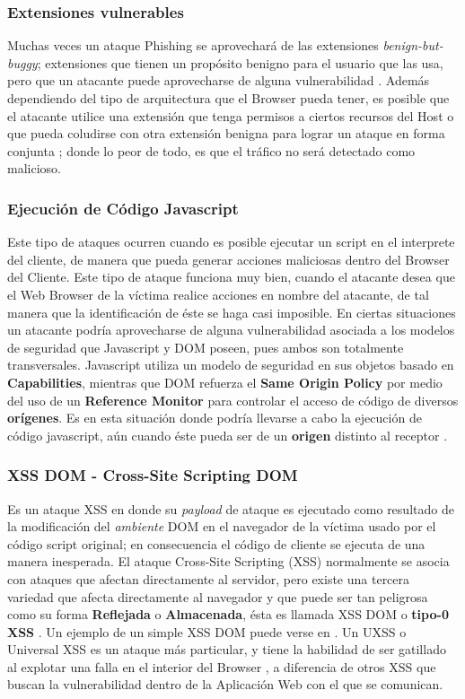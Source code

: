 	\subsubsection{Extensiones vulnerables}
	Muchas veces un ataque Phishing se aprovechará de las extensiones \textit{benign-but-buggy}; extensiones que tienen un propósito benigno para el usuario que las usa, pero que un atacante puede aprovecharse de alguna vulnerabilidad \cite{Barth2010, Liu2012}. Además dependiendo del tipo de arquitectura que el Browser pueda tener, es posible que el atacante utilice una extensión que tenga permisos a ciertos recursos del Host o que pueda coludirse con otra extensión benigna para lograr un ataque en forma conjunta \cite{Saini2014}; donde lo peor de todo, es que el tráfico no será detectado como malicioso.

	\subsubsection{Ejecución de Código Javascript}
    Este tipo de ataques ocurren cuando es posible ejecutar un script en el interprete del cliente, de manera que pueda generar acciones maliciosas dentro del Browser del Cliente. Este tipo de ataque funciona muy bien, cuando el atacante desea que el Web Browser de la víctima realice acciones en nombre del atacante, de tal manera que la identificación de éste se haga casi imposible. En ciertas situaciones un atacante podría aprovecharse de alguna vulnerabilidad asociada a los modelos de seguridad que Javascript y DOM poseen, pues ambos son totalmente transversales. Javascript utiliza un modelo de seguridad en sus objetos basado en \textbf{Capabilities}, mientras que DOM refuerza el \textbf{Same Origin Policy} por medio del uso de un \textbf{Reference Monitor} para controlar el acceso de código de diversos \textbf{orígenes}. Es en esta situación donde podría llevarse a cabo la ejecución de código javascript, aún cuando éste pueda ser de un \textbf{origen} distinto al receptor \cite{Barth2009}.

	\subsubsection{XSS DOM - Cross-Site Scripting DOM}
	Es un ataque XSS en donde su \textit{payload} de ataque es ejecutado como resultado de la modificación del \textit{ambiente} DOM en el navegador de la víctima usado por el código script original; en consecuencia el código de cliente se ejecuta de una manera inesperada. El ataque Cross-Site Scripting (XSS) normalmente se asocia con ataques que afectan directamente al servidor, pero existe una tercera variedad que afecta directamente al navegador \cite{Singh2014} y que puede ser tan peligrosa como su forma \textbf{Reflejada} o \textbf{Almacenada}, ésta es llamada XSS DOM o \textbf{tipo-0 XSS} \cite{XSSDOMOwasp, XSSDOM}. Un ejemplo de un simple XSS DOM puede verse en \cite{bugzillaXSSDOM}. Un UXSS o Universal XSS es un ataque más particular, y tiene la habilidad de ser gatillado al explotar una falla en el interior del Browser \cite{Paola2006}, a diferencia de otros XSS que buscan la vulnerabilidad dentro de la Aplicación Web con el que se comunican.


